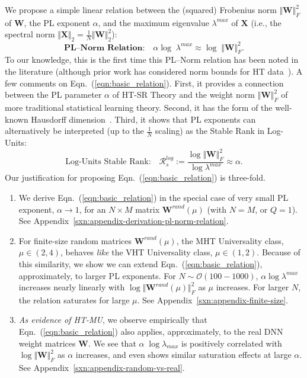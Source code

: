 We propose a simple linear relation between the (squared) Frobenius norm $\Vert\mathbf{W}\Vert^{2}_{F}$ of $\mathbf{W}$, the PL exponent $\alpha$, and the maximum eigenvalue $\lambda^{max}$ of $\mathbf{X}$ (i.e., the spectral norm $\Vert\mathbf{X}\Vert_{2}=\frac{1}{N}\Vert\mathbf{W}\Vert^{2}_{2}$):  
\begin{equation}
\textbf{PL--Norm Relation:} \quad \alpha\log\;\lambda^{max}\approx\log\;\Vert\mathbf{W}\Vert^{2}_{F}  .
\label{eqn:basic_relation}
\end{equation}
To our knowledge, this is the first time this PL--Norm relation has been noted in the literature (although prior work has considered norm bounds for HT data~\cite{MN09_TR}).
A few comments on Eqn.~(\ref{eqn:basic_relation}).
First, it provides a connection between the PL parameter $\alpha$ of HT-SR Theory and the weight norm $\Vert\mathbf{W}\Vert^{2}_{F}$ of more traditional statistical learning theory.
Second, it has the form of the well-known Hausdorff dimension~\cite{Sch07}.
Third, it shows that PL exponents can alternatively be interpreted (up to the $\frac{1}{N}$ scaling) as the Stable Rank in Log-Units:
$$
\mbox{Log-Units Stable Rank:} 
\quad
\mathcal{R}^{log}_{s}:=\dfrac{\log\Vert\mathbf{W}\Vert^{2}_{F}}{\log\lambda^{max}}  \approx \alpha  .
$$
Our justification for proposing Eqn.~(\ref{eqn:basic_relation}) is three-fold.
\begin{enumerate}
\item
\label{enum:first}
We derive Eqn.~(\ref{eqn:basic_relation}) in the special case of very small PL exponent, $\alpha \rightarrow 1$, for an $N\times M$ 
matrix $\mathbf{W}^{rand}(\mu)$ (with $N=M$, or $Q=1$).
See Appendix~\ref{sxn:appendix-derivation-pl-norm-relation}.
\item
\label{enum:second}
For finite-size random matrices $\mathbf{W}^{rand}(\mu)$, the MHT Universality class, $\mu\in(2,4)$, behaves \emph{like} the VHT Universality class, $\mu\in(1,2)$.
Because of this similarity, we show we can extend Eqn.~(\ref{eqn:basic_relation}), approximately, to larger PL exponents.
For $N\sim\mathcal{O}(100-1000)$, $\alpha\log\lambda^{max}$ increases nearly linearly with $\log\Vert\mathbf{W}^{rand}(\mu)\Vert^{2}_{F}$ as $\mu$ increases.
For larger $N$, the relation saturates for large $\mu$. 
See Appendix~\ref{sxn:appendix-finite-size}.
\item
\label{enum:third}
\emph{As evidence of HT-MU}, we observe empirically that Eqn.~(\ref{eqn:basic_relation}) also applies, approximately, to the real DNN weight matrices $\mathbf{W}$. 
We see that $\alpha\;\log\lambda_{max}$ is positively correlated with $\log\Vert\mathbf{W}\Vert^{2}_{F}$ as $\alpha$ increases, and even shows similar saturation effects at large $\alpha$.
See Appendix~\ref{sxn:appendix-random-vs-real}.
\end{enumerate}

